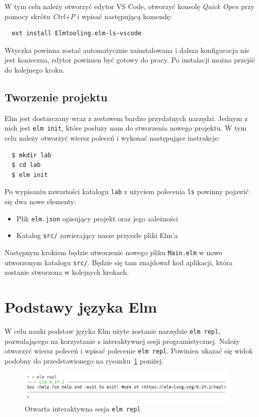 \documentclass[twoside,a4paper]{report}
\begin{document}
W tym celu należy otworzyć edytor VS Code, otworzyć konsolę \textit{Quick Open} przy pomocy skrótu \textit{Ctrl+P} i wpisać następującą komendę:
\begin{lstlisting}
  ext install Elmtooling.elm-ls-vscode
\end{lstlisting}
Wtyczka powinna zostać automatycznie zainstalowana i dalsza konfiguracja nie jest konieczna, edytor powinien być gotowy do pracy.
Po instalacji można przejść do kolejnego kroku.

\subsection{Tworzenie projektu}
Elm jest dostarczany wraz z zestawem bardzo przydatnych narzędzi.
Jednym z nich jest \texttt{elm init}, które posłuży nam do stworzenia nowego projektu.
W tym celu należy otworzyć wiersz poleceń i wykonać następujące instrukcje:

\begin{lstlisting}
  $ mkdir lab
  $ cd lab
  $ elm init
\end{lstlisting}

Po wypisaniu zawartości katalogu \texttt{lab} z użyciem polecenia \texttt{ls} powinny pojawić się dwa nowe elementy:

\begin{itemize}[noitemsep,topsep=0pt]
    \item{Plik \texttt{elm.json} opisujący projekt oraz jego zależności}
    \item{Katalog \texttt{src/} zawierający nasze przyszłe pliki Elm'a}
\end{itemize}

Następnym krokiem będzie utworzenie nowego pliku \texttt{Main.elm} w nowo utworzonym katalogu \texttt{src/}.
Będzie się tam znajdował kod aplikacji, która zostanie stworzona w kolejnych krokach.

\section{Podstawy języka Elm}
W celu nauki podstaw języka Elm użyte zostanie narzędzie \texttt{elm repl}, pozwalającego na korzystanie z interaktywnej sesji programistycznej.
Należy otworzyć wiersz poleceń i wpisać polecenie \texttt{elm repl}.
Powinien ukazać się widok podobny do przedstawionego na rysunku~\ref{fig:elm_repl_output} poniżej.

\begin{figure}[H]
    \centering
    \includegraphics[width=0.95\textwidth]{img/elm_repl_output.png}
    \caption{Otwarta interaktywna sesja \texttt{elm repl}}\label{fig:elm_repl_output}
\end{figure}
\end{document}
